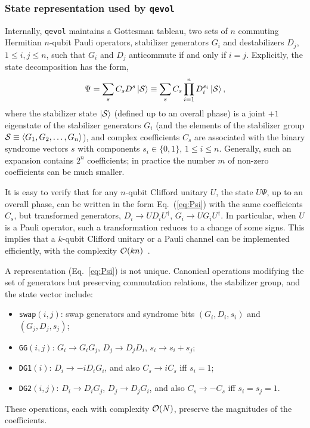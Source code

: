 \subsubsection{State representation used by {\tt qevol}}
\label{sec:state}
Internally, {\tt qevol} maintains a Gottesman
tableau\cite{Aaronson-Gottesman-2004}, two sets of $n$ commuting
Hermitian $n$-qubit Pauli operators, stabilizer generators $G_i$ and
destabilizers $D_j$, $1\le i,j\le n$, such that $G_i$ and $D_j$
anticommute if and only if $i=j$.  Explicitly, the state decomposition
has the form,
\begin{equation}
  \Psi= \sum_s C_s D^s\ket{\cal S}\equiv \sum_s C_s \prod_{i=1}^n
  D_i^{s_i}\ket{\cal S},\label{eq:Psi}
\end{equation}
where the stabilizer state $\ket{\cal S}$ (defined up to an overall
phase) is a joint $+1$ eigenstate of the stabilizer generators $G_i$
(and the elements of the stabilizer group
${\cal S}\equiv \langle G_1,G_2,\ldots, G_n\rangle$), and complex
coefficients $C_s$ are associated with the binary syndrome vectors $s$
with components $s_i\in\{0,1\}$, $1\le i\le n$.  Generally, such an
expansion contains $2^n$ coefficients; in practice the number $m$ of
non-zero coefficients can be much smaller.

It is easy to verify that for any $n$-qubit Clifford unitary $U$, the
state $U\Psi$, up to an overall phase, can be written in the form
Eq.~(\ref{eq:Psi}) with the same coefficients $C_s$, but transformed
generators, $D_i\to UD_iU^\dagger$, $G_i\to UG_iU^\dagger$.  In
particular, when $U$ is a Pauli operator, such a transformation
reduces to a change of some signs.  This
implies that a $k$-qubit Clifford
unitary or a Pauli channel can be implemented efficiently, with the
complexity ${\cal O}(kn)$~\cite{Aaronson-Gottesman-2004}.

A representation (Eq.~\ref{eq:Psi}) is not unique.  Canonical operations
modifying the set of generators but preserving commutation relations,
the stabilizer group, and the state vector include:
\begin{itemize}
\item {\tt swap}$(i,j)$: swap generators and syndrome bits
  $(G_i,D_i,s_i)$ and $(G_j,D_j,s_j)$;
\item {\tt GG}$(i,j)$: $G_i\to G_i G_j$, $D_j\to D_j D_i$,
  $s_i\to s_i+ s_j$;
\item{\tt DG1}$(i)$: $D_i\to -iD_i G_i$, and also $C_s\to iC_s$ iff
  $s_i=1$;
\item{\tt DG2}$(i,j)$: $D_i\to D_i G_j$, $D_j \to D_j G_i$, and also
  $C_s \to -C_s$ iff $s_i=s_j=1$.
\end{itemize}
These operations, each with complexity ${\cal O}(N)$, preserve the
magnitudes of the coefficients.

